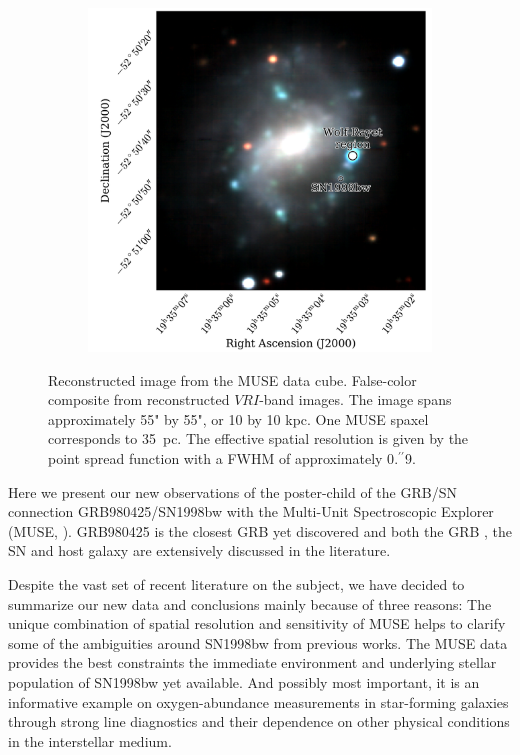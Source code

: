 \documentclass[traditabstract]{aa}
\newcommand{\farc}{\hbox{$.\!\!^{\prime\prime}$}}
\begin{document}
\begin{figure}
\begin{subfigure}{.42\textwidth}
  \includegraphics[width=0.990\linewidth]{Figs/MUSE_SN1998bw_RGB.pdf}
\end{subfigure}
\caption{Reconstructed image from the MUSE data cube. False-color composite from reconstructed $VRI$-band images. The image spans approximately 55" by 55", or 10 by 10 kpc. One MUSE spaxel corresponds to 35~pc. The effective spatial resolution is given by the point spread function with a FWHM of approximately 0\farc{9}.}
\label{fig:HaEW}
\end{figure}


Here we present our new observations of the poster-child of the GRB/SN connection GRB980425/SN1998bw with the Multi-Unit Spectroscopic Explorer (MUSE, \citealp{2010SPIE.7735E..08B}). GRB980425 is the closest GRB yet discovered and both the GRB \citep[e.g.,][]{1998Natur.395..670G, 1998Natur.395..663K}, the SN \citep[e.g.,][]{1998Natur.395..672I, 2001ApJ...555..900P} and host galaxy \citep[e.g.,][]{2000ApJ...542L..89F, 2005NewA...11..103S, 2006A&A...454..103H, 2009ApJ...693..347M} are extensively discussed in the literature. 

Despite the vast set of recent literature on the subject, we have decided to summarize our new data and conclusions mainly because of three reasons: The unique combination of spatial resolution and sensitivity of MUSE helps to clarify some of the ambiguities around SN1998bw from previous works. The MUSE data provides the best constraints the immediate environment and underlying stellar population of SN1998bw yet available. And possibly most important, it is an informative example on oxygen-abundance measurements in star-forming galaxies through strong line diagnostics and their dependence on other physical conditions in the interstellar medium.
\end{document}

